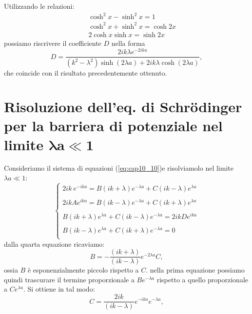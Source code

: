 \documentclass[a4paper,11pt,oneside]{book}
\begin{document}
Utilizzando le relazioni:
\begin{eqnarray}
& &\cosh ^2 x - \sinh ^2 x=1 \nonumber \\
& &\cosh ^2 x + \sinh ^2 x=\cosh 2x  \\
& &2 \cosh  x \sinh  x=\sinh 2x \nonumber 
\end{eqnarray}
possiamo riscrivere il coefficiente $D$ nella forma
\begin{equation}
D=\frac{2ik\lambda e^{-2ika}}{\left(k^2-\lambda^2\right)\sinh \left(2\lambda a\right)+2ik\lambda \cosh\left(2\lambda a\right)},
\end{equation}
che coincide con il risultato precedentemente ottenuto.
\section{Risoluzione dell'eq. di Schr\"{o}dinger per la barriera di potenziale nel limite $\mathbf{\lambda a \ll 1}$}
Consideriamo il sistema di equazioni (\ref{eq:cap10_10})e risolviamolo nel limite $\lambda a \ll 1$:
\begin{equation}
\begin{cases}
\displaystyle{2ik\ e^{-ika}=B\left( ik+\lambda\right)e^{-\lambda a} + C\left( ik-\lambda\right)e^{\lambda a}}\\
\\
\displaystyle{2ikA e^{ika}=B\left( ik-\lambda\right)e^{-\lambda a} + C\left( ik+\lambda\right)e^{\lambda a}}\\
\\
\displaystyle{B\left( ik+\lambda\right)e^{\lambda a} + C\left( ik-\lambda\right)e^{-\lambda a}}= 2ikD e^{ika}\\
\\
\displaystyle{B\left( ik-\lambda\right)e^{\lambda a} + C\left( ik+\lambda\right)e^{-\lambda a}}= 0\\
\end{cases}
\end{equation} 
dalla quarta equazione ricaviamo:
\begin{equation}
B=-\frac{(ik+\lambda)}{(ik-\lambda)}e^{-2 \lambda a } C,
\end{equation}
ossia $B$ è esponenzialmente piccolo rispetto a $C$.  nella prima equazione possiamo quindi trascurare il termine proporzionale a $Be^{-\lambda a}$ rispetto a quello proporzionale a $Ce^{\lambda a }$. Si ottiene in tal modo:
\begin{equation}
C= \frac{2ik}{(ik-\lambda)}e^{-ika}e^{-\lambda a},
\end{equation}
\end{document}
